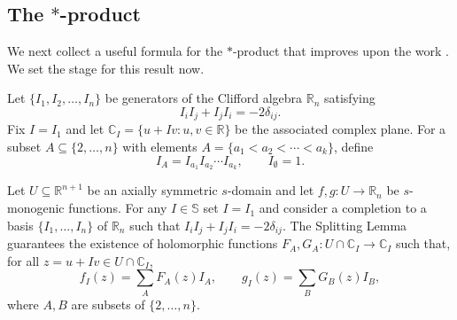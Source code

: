 \documentclass[11pt]{amsart}
\begin{document}
\subsection{\texorpdfstring{The $\ast$-product}{The *-product}}

We next collect a useful formula for the $\ast$-product that improves upon the work \cite{MR2684426}.  We set the stage for this result now.

Let $\{I_1, I_2, \ldots, I_n\}$ be generators of the Clifford algebra $\mathbb{R}_n$ satisfying
\[
I_i I_j + I_j I_i = -2\delta_{ij}.
\]
Fix $I = I_1$ and let $\mathbb{C}_I = \{u + Iv : u, v \in \mathbb{R}\}$ be the associated complex plane.  For a subset $A \subseteq \{2, \ldots, n\}$ with elements $A = \{a_1 < a_2 < \cdots < a_k\}$, define
\[
I_A = I_{a_1} I_{a_2} \cdots I_{a_k}, \qquad I_\emptyset = 1.
\]



Let $U \subseteq \mathbb{R}^{n+1}$ be an axially symmetric $s$-domain and let $f, g : U \to \mathbb{R}_n$ be $s$-monogenic functions. For any $I \in \mathbb{S}$ set $I = I_1$ and consider a completion to a basis $\{I_1, \ldots, I_n\}$ of $\mathbb{R}_n$ such that $I_i I_j + I_j I_i = -2\delta_{ij}$. The Splitting Lemma guarantees the existence of holomorphic functions $F_A, G_A : U \cap \mathbb{C}_I \to \mathbb{C}_I$ such that, for all $z = u + Iv \in U \cap \mathbb{C}_I$,
\[
f_I(z) = \sum_A F_A(z) I_A, \qquad g_I(z) = \sum_B G_B(z) I_B,
\]
where $A, B$ are subsets of $\{2, \ldots, n\}$.

\end{document}
